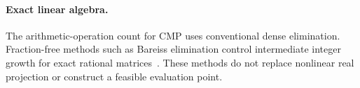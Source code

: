\paragraph{Exact linear algebra.}
The arithmetic-operation count for CMP uses conventional dense elimination.
Fraction-free methods such as Bareiss elimination control intermediate integer
growth for exact rational matrices~\cite{Bareiss1968}.  These methods do not
replace nonlinear real projection or construct a feasible evaluation point.
